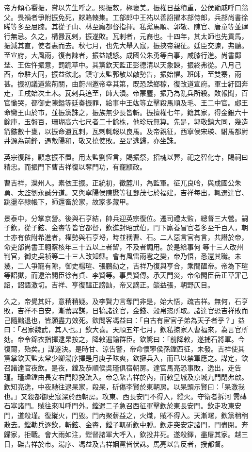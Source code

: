 \begin{pinyinscope}
帝方傾心嚮振，嘗以先生呼之。賜振敕，極褒美。振權日益積重，公侯勛戚呼曰翁父。畏禍者爭附振免死，賕賂輳集。工部郎中王祐以善諂擢本部侍郎，兵部尚書徐晞等多至屈膝。其從子山、林至廕都督指揮。私黨馬順、郭敬、陳官、唐童等並肆行無忌。久之，構釁瓦剌，振遂敗。瓦剌者，元裔也。十四年，其太師也先貢馬，振減其直，使者恚而去。秋七月，也先大舉入寇，振挾帝親征。廷臣交諫，弗聽。至宣府，大風雨，復有諫者，振益虓怒。成國公朱勇等白事，咸膝行進。尚書鄺埜、王佐忤振意，罰跪草中。其黨欽天監正彭德清以天象諫，振終弗從。八月己酉，帝駐大同，振益欲北。鎮守太監郭敬以敵勢告，振始懼。班師，至雙寨，雨甚。振初議道紫荊關，由蔚州邀帝幸其第，既恐蹂鄉稼，復改道宣府。軍士紆回奔走，壬戌始次土木。瓦剌兵追至，師大潰。帝蒙塵，振乃為亂兵所殺。敗報聞，百官慟哭，都御史陳鎰等廷奏振罪，給事中王竑等立擊殺馬順及毛、王二中官。郕王命臠王山於市，並振黨誅之，振族無少長皆斬。振擅權七年，籍其家，得金銀六十餘庫，玉盤百，珊瑚高六七尺者二十餘株，他珍玩無算。先是，郭敬鎮大同，幾造箭鏃數十甕，以振命遺瓦剌，瓦剌輒報以良馬。及帝親征，西寧侯宋瑛、駙馬都尉井源為前鋒，遇敵陽和，敬又撓使敗。至是逃歸，亦坐誅。

英宗復辟，顧念振不置。用太監劉恆言，賜振祭，招魂以葬，祀之智化寺，賜祠曰精忠。而振門下曹吉祥復以奪門功，有寵顓政。

曹吉祥，灤州人。素依王振。正統初，徵麓川，為監軍。征兀良哈，與成國公朱勇、太監劉永誠分道。又與寧陽侯陳懋等征鄧茂七於福建，吉祥每出，輒選達官、跳盪卒隸帳下，師還畜於家，故家多藏甲。

景泰中，分掌京營。後與石亨結，帥兵迎英宗復位。遷司禮太監，總督三大營。嗣子欽，從子鉉、金睿等皆官都督，欽進封昭武伯，門下廝養冒官者多至千百人，朝士亦有依附希進者，權勢與石亨埒，時並稱曹、石。二人惡言官有言，共譖於帝，命吏部尚書王翱察核年三十五以上者留，不及者調用。於是給事何等十三人改州判官，御史吳禎等二十三人改知縣。會有風雷雨雹之變，帝乃悟，悉還其職。未幾，二人爭寵有隙，御史楊瑄、張鵬劾之，吉祥乃復與亨合，乘間醖帝。帝為下瑄等詔獄，而逮治閣臣徐有貞、李賢等。事具賢傳。承天門災，帝命閣臣岳正草罪己詔，詔語激切。吉祥、亨復醖正謗訕，帝又謫正。燄益張，朝野仄目。

久之，帝覺其奸，意稍稍疑。及李賢力言奪門非是，始大悟，疏吉祥。無何，石亨敗，吉祥不自安，漸蓄異謀，日犒諸達官，金錢、穀帛恣所取。諸達官恐吉祥敗而己隨黜退也，皆願盡力效死。欽問客馮益曰：「自古有宦官子弟為天子者乎？」益曰：「君家魏武，其人也。」欽大喜。天順五年七月，欽私掠家人曹福來，為言官所劾。帝令錦衣指揮逮杲按之，降敕遍諭群臣。欽驚曰：「前降敕，遂捕石將軍。今復爾，殆矣。」謀遂決。是時甘、涼告警，帝命懷寧侯孫鏜西征，未發。吉祥使其黨掌欽天監太常少卿湯序擇是月庚子昧爽，欽擁兵入，而已以禁軍應之。謀定，欽召諸達官夜飲。是夜，鏜及恭順侯吳瑾俱宿朝房。達官馬亮恐事敗，逸出，走告瑾。瑾趣鏜由長安右門隙投疏入。帝急縶吉祥於內，而敕皇城及京城九門閉弗啟。欽知亮逸，中夜馳往逮杲家，殺杲，斫傷李賢於東朝房。以杲頭示賢曰：「杲激我也。」又殺都御史寇深於西朝房。攻東、西長安門不得入，縱火。守衛者拆河需磚石塞諸門。賊往來叫呼門外。鏜遣二子急召西征軍擊欽於東長安門。欽走攻東安門，道殺瑾。復縱火，門毀。門內聚薪益之，火熾，賊不得入。天漸曙，欽黨稍稍散去。鏜勒兵逐欽，斬鉉、金睿，鏜子軏斫欽中膊。欽走突安定諸門，門盡閉。奔歸家，拒戰。會大雨如注，鏜督諸軍大呼入，欽投井死。遂殺鐸，盡屠其家。越三日，磔吉祥於市。湯序、馮益及吉祥姻黨皆伏誅。馬亮以告反者，授都督。


\end{pinyinscope}
